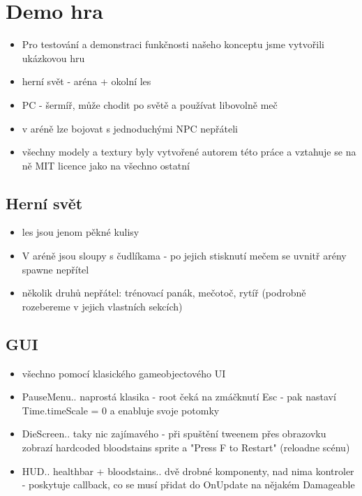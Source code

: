 \section{Demo hra}
\begin{itemize}
  \item Pro testování a demonstraci funkčnosti našeho konceptu jsme vytvořili ukázkovou hru
  \item herní svět - aréna + okolní les
  \item PC - šermíř, může chodit po světě a používat libovolně meč
  \item v aréně lze bojovat s jednoduchými NPC nepřáteli
  \item všechny modely a textury byly vytvořené autorem této práce a vztahuje se na ně MIT licence jako na všechno ostatní
\end{itemize}

\subsection{Herní svět}
\begin{itemize}
  \item les jsou jenom pěkné kulisy
  \item V aréně jsou sloupy s čudlíkama - po jejich stisknutí mečem se uvnitř arény spawne nepřítel
  \item několik druhů nepřátel: trénovací panák, mečotoč, rytíř (podrobně rozebereme v jejich vlastních sekcích)
\end{itemize}

\subsection{GUI}
\begin{itemize}
  \item všechno pomocí klasického gameobjectového UI
  \item PauseMenu.. naprostá klasika - root čeká na zmáčknutí Esc - pak nastaví Time.timeScale = 0 a enabluje svoje potomky
  \item DieScreen.. taky nic zajímavého - při spuštění tweenem přes obrazovku zobrazí hardcoded bloodstains sprite a "Press F to Restart" (reloadne scénu)
  \item HUD.. healthbar + bloodstains.. dvě drobné komponenty, nad nima kontroler - poskytuje callback, co se musí přidat do OnUpdate na nějakém Damageable
\end{itemize}


